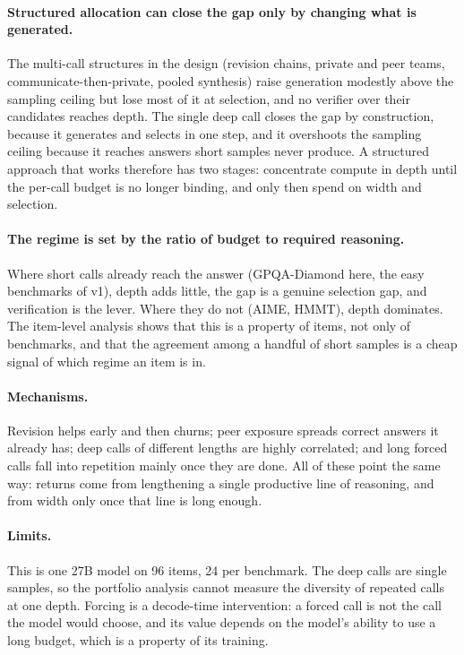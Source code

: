 \documentclass[11pt]{article}
\begin{document}
{{{{\paragraph{Structured allocation can close the gap only by changing what is generated.} The multi-call
structures in the design (revision chains, private and peer teams, communicate-then-private, pooled synthesis)
raise generation modestly above the sampling ceiling but lose most of it at selection, and no verifier over
their candidates reaches depth. The single deep call closes the gap by construction, because it generates and
selects in one step, and it overshoots the sampling ceiling because it reaches answers short samples never
produce. A structured approach that works therefore has two stages: concentrate compute in depth until the
per-call budget is no longer binding, and only then spend on width and selection.

\paragraph{The regime is set by the ratio of budget to required reasoning.} Where short calls already reach the
answer (GPQA-Diamond here, the easy benchmarks of v1), depth adds little, the gap is a genuine selection gap,
and verification is the lever. Where they do not (AIME, HMMT), depth dominates. The item-level analysis shows
that this is a property of items, not only of benchmarks, and that the agreement among a handful of short
samples is a cheap signal of which regime an item is in.

\paragraph{Mechanisms.} Revision helps early and then churns; peer exposure spreads correct answers it already
has; deep calls of different lengths are highly correlated; and long forced calls fall into repetition mainly
once they are done. All of these point the same way: returns come from lengthening a single productive line
of reasoning, and from width only once that line is long enough.

\paragraph{Limits.} This is one 27B model on 96 items, 24 per benchmark. The deep calls are single samples, so
the portfolio analysis cannot measure the diversity of repeated calls at one depth. Forcing is a decode-time
intervention: a forced call is not the call the model would choose, and its value depends on the model's
ability to use a long budget, which is a property of its training.

}}}}
\end{document}
